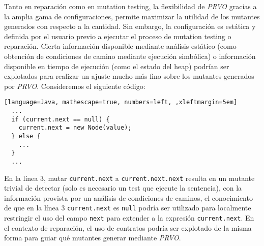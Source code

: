 Tanto en reparaci\'on como en mutation testing, la flexibilidad de \emph{PRVO} gracias a la amplia gama de configuraciones, permite maximizar la utilidad de los mutantes generados con respecto a la cantidad. Sin embargo, la configuraci\'on es est\'atica y definida por el usuario previo a ejecutar el proceso de mutation testing o reparaci\'on. Cierta informaci\'on disponible mediante an\'alisis est\'atico (como obtenci\'on de condiciones de camino mediante ejecuci\'on simb\'olica) o informaci\'on disponible en tiempo de ejecuci\'on (como el estado del heap) podr\'ian ser explotados para realizar un ajuste mucho m\'as fino sobre los mutantes generados por \emph{PRVO}. Consideremos el siguiente c\'odigo:
\begin{lstlisting}[language=Java, mathescape=true, numbers=left, ,xleftmargin=5em]
  ...
  if (current.next == null) {
    current.next = new Node(value);
  } else {
    ...
  }
  ...
\end{lstlisting}
En la l\'inea $3$, mutar \texttt{current.next} a \texttt{current.next.next} resulta en un mutante trivial de detectar (solo es necesario un test que ejecute la sentencia), con la informaci\'on provista por un an\'alisis de condiciones de caminos, el conocimiento de que en la l\'inea $3$ \texttt{current.next} es \texttt{null} podr\'ia ser utilizado para localmente restringir el uso del campo \texttt{next} para extender a la expresi\'on \texttt{current.next}.
En el contexto de reparaci\'on, el uso de contratos podr\'ia ser explotado de la misma forma para guiar qu\'e mutantes generar mediante \emph{PRVO}.

